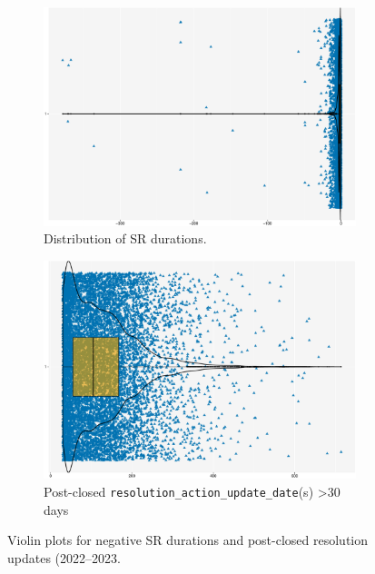 \documentclass[linenumber]{jdsart}
\begin{document}
\begin{figure}[tbp]
  \centering
  \begin{subfigure}[t]{0.495\textwidth} %
    \centering
    \includegraphics[width=\textwidth]{negative_duration_SR_violin.pdf}
    \caption{Distribution of SR durations.}
    \label{fig:negative-duration-violin}
  \end{subfigure}
  \hfill %
  \begin{subfigure}[t]{0.495\textwidth} %
    \centering
    \includegraphics[width=\textwidth]{post_closed_violin_chart.pdf}
    \caption{Post-closed \texttt{resolution\_action\_update\_date}(s) >30 days}
    \label{fig:resolution-violin}
  \end{subfigure}
  \caption{Violin plots for negative SR durations and post-closed
    resolution updates (2022--2023.}
  \label{fig:violin-plots}
\end{figure}
\end{document}
